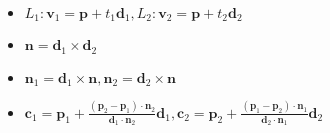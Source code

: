 \begin{itemize}[nosep]
  \item $L_1: \boldsymbol{v}_1 = \boldsymbol{p} + t_1\boldsymbol{d}_1, L_2: \boldsymbol{v}_2 = \boldsymbol{p} + t_2\boldsymbol{d}_2$
  \item $\boldsymbol{n} = \boldsymbol{d}_1\times \boldsymbol{d}_2$
  \item $\boldsymbol{n}_1 = \boldsymbol{d}_1 \times \boldsymbol{n}, \boldsymbol{n}_2 = \boldsymbol{d}_2 \times \boldsymbol{n}$
  \item
    $\boldsymbol{c}_1 = \boldsymbol{p}_1 + \frac{(\boldsymbol{p}_2 - \boldsymbol{p}_1)\cdot\boldsymbol{n}_2}{\boldsymbol{d}_1\cdot\boldsymbol{n}_2}\boldsymbol{d}_1,
  \boldsymbol{c}_2 = \boldsymbol{p}_2 + \frac{(\boldsymbol{p}_1 - \boldsymbol{p}_2)\cdot\boldsymbol{n}_1}{\boldsymbol{d}_2\cdot\boldsymbol{n}_1}\boldsymbol{d}_2$
  \\
\end{itemize}
